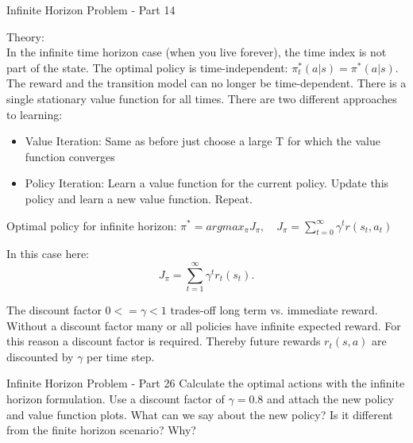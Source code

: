 \begin{questions}
\begin{question}{Infinite Horizon Problem - Part 1}{4}
\begin{answer}
Theory: \\
In the infinite time horizon case (when you live forever), the time index is not part of the state.  The optimal policy is time-independent: $\pi_t^*(a|s)=\pi^*(a|s)$. The reward and the transition model can no longer be time-dependent. There is a single stationary value function for all times. There are two different approaches to learning:
\begin{itemize}
	\item Value Iteration: Same as before just choose a large T for which the value function converges
	\item Policy Iteration: Learn a value function for the current policy. Update this policy and learn a new value function. Repeat.
\end{itemize}
Optimal policy for infinite horizon: $\pi^*=argmax_\pi J_\pi, \quad J_\pi=\sum_{t=0}^\infty \gamma^t r(s_t, a_t)$

In this case here:\\
\begin{equation}
J_\pi = \sum_{t=1}^{\infty} \gamma^t r_t(s_t).
\end{equation}

The discount factor $0<=\gamma<1$ trades-off long term vs. immediate reward. Without a discount factor many or all policies have infinite expected reward. For this reason a discount factor is required. Thereby future rewards $r_t(s,a)$ are discounted by $\gamma$ per time step.

	
\end{answer}

\end{question}



\begin{question}{Infinite Horizon Problem - Part 2}{6}
Calculate the optimal actions with the infinite horizon formulation. Use a discount factor of $\gamma=0.8$ and attach the new policy and value function plots.
What can we say about the new policy? Is it different from the finite horizon scenario? Why?


\end{question}
\end{questions}

